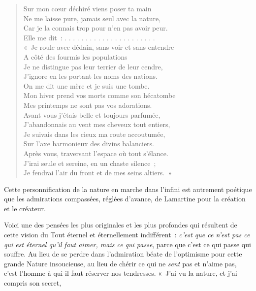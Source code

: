 \documentclass[french,twoside]{book} %
\begin{document}
\begin{verse}
Sur mon cœur déchiré viens poser ta main\\
Ne me laisse pure, jamais seul avec la nature,\\
Car je la connais trop pour n’en pas avoir peur.\\
Elle me dit : . . . . . . . . . . . . . . . . . . . . . .\\
« Je roule avec dédain, sans voir et sans entendre\\
A côté des fourmis les populations\\
Je ne distingue pas leur terrier de leur cendre,\\
J’ignore en les portant les noms des nations.\\
On me dit une mère et je suis une tombe.\\
Mon hiver prend vos morts comme son hécatombe\\
Mes printemps ne sont pas vos adorations.\\
Avant vous j’étais belle et toujours parfumée,\\
J’abandonnais au vent mes cheveux tout entiers,\\
Je suivais dans les cieux ma route accoutumée,\\
Sur l’axe harmonieux des divins balanciers.\\
Après vous, traversant l’espace où tout s’élance.\\
J’irai seule et sereine, en un chaste silence ;\\
Je fendrai l’air du front et de mes seins altiers. »\\
\end{verse}

\noindent Cette personnification de la nature en marche dans l’infini est autrement poétique que les admirations compassées, réglées d’avance, de Lamartine pour la création et le créateur.\par
Voici une des pensées les plus originales et les plus profondes qui résultent de cette vision du Tout éternel et éternellement indifférent : \emph{c’est que ce n’est pas ce qui est éternel qu’il faut aimer, mais ce qui passe}, parce que c’est ce qui passe qui souffre. Au lieu de se perdre dans l’admiration béate de l’optimisme pour cette grande Nature insoucieuse, au lieu de chérir ce qui ne\emph{ sent} pas et n’aime pas, c’est l’homme à qui il faut réserver nos tendresses. « J’ai vu la nature, et j’ai compris son secret,\par
\end{document}
